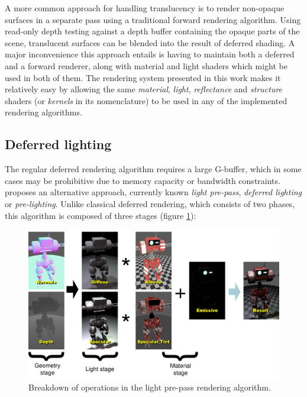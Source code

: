 A more common approach for handling translucency is to render non-opaque surfaces in a separate pass using a traditional forward rendering algorithm. Using read-only depth testing against a depth buffer containing the opaque parts of the scene, translucent surfaces can be blended into the result of deferred shading. A major inconvenience this approach entails is having to maintain both a deferred and a forward renderer, along with material and light shaders which might be used in both of them. The rendering system presented in this work makes it relatively easy by allowing the same \emph{material}, \emph{light}, \emph{reflectance} and \emph{structure} shaders (or \emph{kernels} in its nomenclature) to be used in any of the implemented rendering algorithms.

\subsection{Deferred lighting}
\label{sec:DeferredLighting}

The regular deferred rendering algorithm requires a large G-buffer, which in some cases may be prohibitive due to memory capacity or bandwidth constraints. \citet{Engel08PrePass} proposes an alternative approach, currently known \emph{light pre-pass}, \emph{deferred lighting} or \emph{pre-lighting}. Unlike classical deferred rendering, which consists of two phases, this algorithm is composed of three stages (figure \ref{fig:LightPrePassComposition}):

\begin{figure}[h!]
  \centering
    \includegraphics[width=0.9\linewidth]{./Figures/deferredComposition/lightPrePassComposition.pdf}
    \caption[Light pre-pass pipeline]{Breakdown of operations in the light pre-pass rendering algorithm.}
  \label{fig:LightPrePassComposition}
\end{figure}

